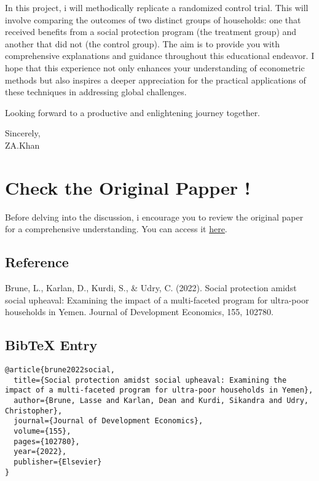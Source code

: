 \documentclass{article}
\begin{document}
\vspace{0.1cm}In this project, i will methodically replicate a randomized control trial. This will involve comparing the outcomes of two distinct groups of households: one that received benefits from a social protection program (the treatment group) and another that did not (the control group). \newline
The aim is to provide you with comprehensive explanations and guidance throughout this educational endeavor. I hope that this experience not only enhances your understanding of econometric methods but also inspires a deeper appreciation for the practical applications of these techniques in addressing global challenges.\newline

\vspace{0.3cm}Looking forward to a productive and enlightening journey together.\vspace{0.5cm} 

\vspace{0.5cm}
\noindent
Sincerely,\\
\vspace{2cm} %
ZA.Khan

\newpage
\tableofcontents


\section*{Check the Original Papper !}

Before delving into the discussion, i encourage you to review the original paper for a comprehensive understanding. You can access it \href{https://www.sciencedirect.com/science/article/pii/S0304387821001395}{here}.

\subsection*{Reference}
Brune, L., Karlan, D., Kurdi, S., \& Udry, C. (2022). Social protection amidst social upheaval: Examining the impact of a multi-faceted program for ultra-poor households in Yemen. Journal of Development Economics, 155, 102780.

\subsection*{BibTeX Entry}
\begin{verbatim}
@article{brune2022social,
  title={Social protection amidst social upheaval: Examining the impact of a multi-faceted program for ultra-poor households in Yemen},
  author={Brune, Lasse and Karlan, Dean and Kurdi, Sikandra and Udry, Christopher},
  journal={Journal of Development Economics},
  volume={155},
  pages={102780},
  year={2022},
  publisher={Elsevier}
}
\end{verbatim}
\end{document}
